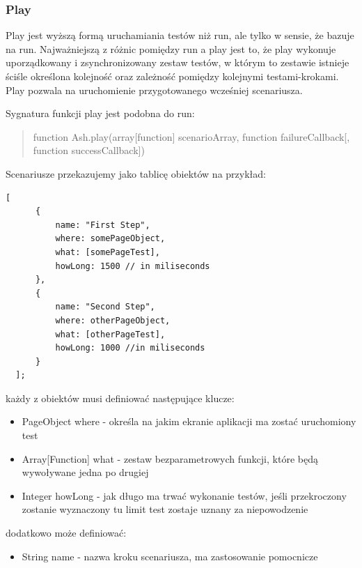 \documentclass[brudnopis]{xmgr}
\begin{document}
\subsubsection{Play} 

Play jest wyższą formą uruchamiania testów niż run, ale tylko w sensie, że bazuje na run. Najważniejszą z różnic pomiędzy run a play jest to, że play wykonuje uporządkowany i zsynchronizowany zestaw testów, w którym to zestawie istnieje ściśle określona kolejność oraz zależność pomiędzy kolejnymi testami-krokami. Play pozwala na uruchomienie przygotowanego wcześniej scenariusza. 

Sygnatura funkcji play jest podobna do run:

\begin{quote}
function Ash.play(array[function] scenarioArray, function failureCallback[, function successCallback]) 
\end{quote}

Scenariusze przekazujemy jako tablicę obiektów na przykład:

\begin{lstlisting}
[
      {
          name: "First Step",
          where: somePageObject,
          what: [somePageTest],
          howLong: 1500	// in miliseconds
      },
      {
          name: "Second Step",
          where: otherPageObject,
          what: [otherPageTest],
          howLong: 1000	//in miliseconds
      }
  ];
\end{lstlisting}

każdy z obiektów musi definiować następujące klucze:

\begin{itemize}
  \item PageObject where - określa na jakim ekranie aplikacji ma zostać uruchomiony test
  \item Array[Function] what - zestaw bezparametrowych funkcji, które będą wywoływane jedna po drugiej 
  \item Integer howLong - jak długo ma trwać wykonanie testów, jeśli przekroczony zostanie wyznaczony tu limit test zostaje uznany za niepowodzenie 
\end{itemize}

dodatkowo może definiować:

\begin{itemize} 
  \item String name - nazwa kroku scenariusza, ma zastosowanie pomocnicze
\end{itemize}
\end{document}
